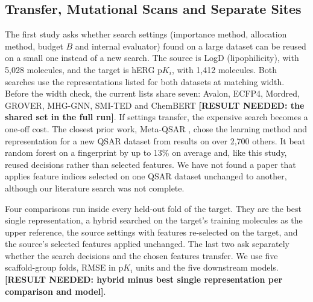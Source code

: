 \subsection{Transfer, Mutational Scans and Separate Sites}


The first study asks whether search settings (importance method, allocation method, budget $B$ and internal evaluator) found on a large dataset can be reused on a small one instead of a new search. The source is LogD (lipophilicity), with 5,028 molecules, and the target is hERG $\mathrm{p}K_i$, with 1,412 molecules. Both searches use the representations listed for both datasets at matching width. Before the width check, the current lists share seven: Avalon, ECFP4, Mordred, GROVER, MHG-GNN, SMI-TED and ChemBERT \textbf{[RESULT NEEDED: the shared set in the full run]}. If settings transfer, the expensive search becomes a one-off cost. The closest prior work, Meta-QSAR \citep{Olier2018}, chose the learning method and representation for a new QSAR dataset from results on over 2,700 others. It beat random forest on a fingerprint by up to 13\% on average and, like this study, reused decisions rather than selected features. We have not found a paper that applies feature indices selected on one QSAR dataset unchanged to another, although our literature search was not complete.

Four comparisons run inside every held-out fold of the target. They are the best single representation, a hybrid searched on the target's training molecules as the upper reference, the source settings with features re-selected on the target, and the source's selected features applied unchanged. The last two ask separately whether the search decisions and the chosen features transfer. We use five scaffold-group folds, RMSE in $\mathrm{p}K_i$ units and the five downstream models. \textbf{[RESULT NEEDED: hybrid minus best single representation per comparison and model]}.

